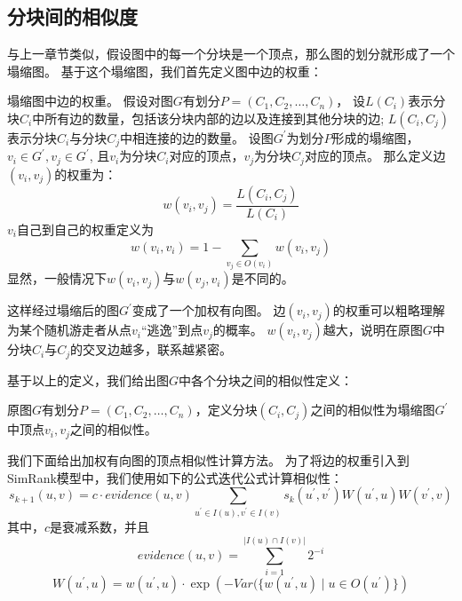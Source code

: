 \documentclass[master]{njuthesis}
\begin{document}
\subsection{分块间的相似度}
与上一章节类似，假设图中的每一个分块是一个顶点，那么图的划分就形成了一个塌缩图。
基于这个塌缩图，我们首先定义图中边的权重：
\begin{definition}
 塌缩图中边的权重。 假设对图$G$有划分$P=(C_1, C_2, \dots, C_n)$，
 设$L(C_i)$表示分块$C_i$中所有边的数量，包括该分块内部的边以及连接到其他分块的边;
 $L(C_i, C_j)$表示分块$C_i$与分块$C_j$中相连接的边的数量。
 设图$G^\prime$为划分$P$形成的塌缩图，$v_i \in G^\prime, v_j \in G^\prime$, 
 且$v_i$为分块$C_i$对应的顶点，$v_j$为分块$C_j$对应的顶点。
 那么定义边$(v_i, v_j)$的权重为：
\begin{equation}
 w(v_i, v_j) = \frac{L(C_i, C_j)}{L(C_i)} 
\end{equation}
$v_i$自己到自己的权重定义为
\begin{equation}
 w(v_i, v_i) = 1-\sum_{v_j \in O(v_i)}{w(v_i, v_j)}
 \end{equation}
显然，一般情况下$w(v_i, v_j)$与$w(v_j, v_i)$是不同的。
\end{definition}
这样经过塌缩后的图$G^\prime$变成了一个加权有向图。
边$(v_i, v_j)$的权重可以粗略理解为某个随机游走者从点$v_i$“逃逸”到点$v_j$的概率。
$w(v_i, v_j)$越大，说明在原图$G$中分块$C_i$与$C_j$的交叉边越多，联系越紧密。

基于以上的定义，我们给出图$G$中各个分块之间的相似性定义：
\begin{definition}
 原图$G$有划分$P=(C_1, C_2, \dots, C_n)$，定义分块$(C_i, C_j)$之间的相似性为塌缩图$G^\prime$中顶点$v_i,v_j$之间的相似性。
\end{definition}
我们下面给出加权有向图的顶点相似性计算方法。
 为了将边的权重\cite{DBLP:journals/pvldb/AntonellisGC08}引入到SimRank模型中，我们使用如下的公式迭代公式计算相似性：
\begin{equation}
  s_{k+1}(u,v) = c \cdot evidence(u,v)  
  \sum_{u^\prime \in I(u), v^\prime \in I(v)} s_{k}(u^\prime, v^\prime)W(u^\prime, u)W(v^\prime, v)
\end{equation}
其中，$c$是衰减系数，并且
\begin{equation}
    evidence(u,v)=\sum_{i=1}^{|I(u)\cap I(v)|}2^{-i} 
   \end{equation}
\begin{equation}
     W(u^\prime, u)=w(u^\prime, u)\cdot \exp(-{Var(\{w(u^\prime,u) \mid u \in O(u^\prime)\}})
\end{equation}
\end{document}
